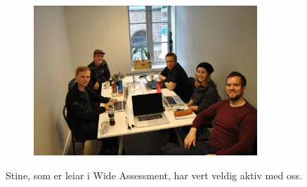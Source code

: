 \documentclass[12pt]{article}
\begin{document}
\begin{figure}[h]
  \includegraphics[width=0.75\textwidth]{Studenter}
  \centering
\end{figure}

Stine, som er leiar i Wide Assessment, har vert veldig aktiv med oss.
\end{document}
